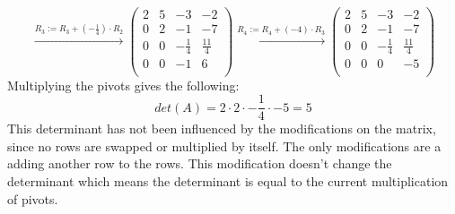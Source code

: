 \documentclass[a4paper]{article}
\begin{document}
\[
\xrightarrow{R_3 := R_3 + (-\frac{1}{4}) \cdot R_2}
\left(
\begin{array}{rrrr}
2 & 5 & -3 & -2 \\
0 & 2 & -1 & -7 \\
0 & 0 & - \frac{1}{4} & \frac{11}{4} \\
0 & 0 & -1 & 6 \\
\end{array}
\right)
\xrightarrow{R_4 := R_4 + (-4) \cdot R_3}
\left(
\begin{array}{rrrr}
2 & 5 & -3 & -2 \\
0 & 2 & -1 & -7 \\
0 & 0 & - \frac{1}{4} & \frac{11}{4} \\
0 & 0 & 0 & -5 \\
\end{array}
\right)
\]
Multiplying the pivots gives the following:
\[det(A) = 2 \cdot 2 \cdot - \frac{1}{4} \cdot -5 = 5\]
This determinant has not been influenced by the modifications on the matrix, since no rows are swapped or multiplied by itself. The only modifications are a adding another row to the rows. This modification doesn't change the determinant which means the determinant is equal to the current multiplication of pivots.
\end{document}
